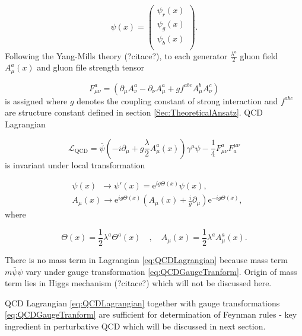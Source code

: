 \documentclass[a4paper,11pt]{report}
\newcommand{\Euler}{\mathrm{e}}
\begin{document}
\begin{equation}
  \psi(x) = \begin{pmatrix}  
    \psi_r(x) \\ \psi_g(x) \\ \psi_b(x) \\ 
            \end{pmatrix}.
  \label{eq:QuarkWaveFunction}
\end{equation}
Following the Yang-Mills theory (?citace?), to each generator
$\frac{\lambda^a}{2}$ gluon field $A_\mu^a(x)$ and gluon file strength tensor

\begin{equation}
  F_{\mu\nu}^a = \left( \partial_\mu A_\nu^a - \partial_\nu A_\mu^a + g f^{abc}
  A_\mu^b A_\nu^c \right)
  \label{eq:GluonFieldStrengthTensor}
\end{equation}
is assigned where $g$ denotes the coupling constant of strong interaction and
$f^{abc}$ are structure constant defined in section \ref{Sec:TheoreticalAnsatz}.
QCD Lagrangian

\begin{equation}
  \mathscr{L}_{\text{QCD}} = \bar{\psi} \left( -i \partial_\mu + g \frac{\lambda}{2}
  A_\mu^a(x) \right) \gamma^\mu \psi - \frac{1}{4}F_{\mu\nu}^aF_a^{\mu\nu}
  \label{eq:QCDLagrangian}
\end{equation}
is invariant under local transformation

\begin{align}
  &\psi(x) \, \, \, \rightarrow \psi'(x) = \Euler^{ig\Theta(x)} \psi(x),
    \label{eq:QCDGaugeTranform} \\
  &A_\mu(x) \rightarrow \Euler^{ig\Theta(x)} \left( A_\mu(x) +
    \frac{i}{g}\partial_\mu \right) \Euler^{-ig\Theta(x)}, 
\end{align}
where

\begin{equation}
  \Theta(x) = \frac{1}{2} \lambda^a \Theta^a(x) 
  \quad , \quad
  A_\mu(x) = \frac{1}{2} \lambda^a A_\mu^a(x).
  \label{eq:QCDAdditionalFunctions}
\end{equation}

There is no mass term in Lagrangian \eqref{eq:QCDLagrangian} because mass term
$m\bar{\psi}\psi$ vary under gauge transformation
\eqref{eq:QCDGaugeTranform}. Origin of mass term lies in Higgs mechanism
(?citace?) which will not be discussed here. 

QCD Lagrangian \eqref{eq:QCDLagrangian} together with gauge transformations
\eqref{eq:QCDGaugeTranform} are sufficient for determination of Feynman rules -
key ingredient in perturbative QCD which will be discussed in next section.
\end{document}
